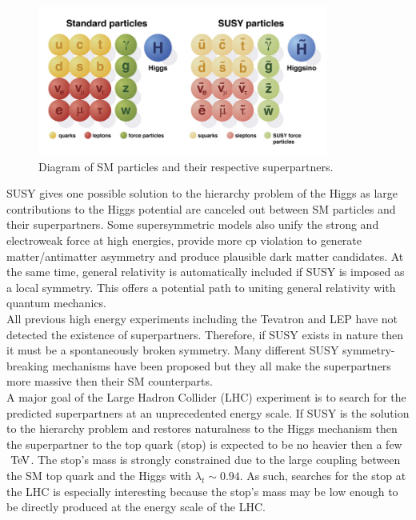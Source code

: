 \begin{figure}[h!]
\centering
    \includegraphics[width=0.85\textwidth]{figures/strategy/SUSYparticles.jpg}\hspace{0.05\textwidth}
\caption[Diagram of SM particles and their respective superpartners]{ Diagram of SM particles and their respective superpartners. }
\label{fig:SUSYpart}
\end{figure}

\indent SUSY gives one possible solution to the hierarchy problem of the Higgs as large contributions to the Higgs potential are canceled out between SM particles and their superpartners.  Some supersymmetric models also unify the strong and electroweak force at high energies, provide more cp violation to generate matter/antimatter asymmetry and produce plausible dark matter candidates.  At the same time, general relativity is automatically included if SUSY is imposed as a local symmetry. This offers a potential path to uniting general relativity with quantum mechanics.  \\

\indent All previous high energy experiments including the Tevatron and LEP have not detected the existence of superpartners.  Therefore, if SUSY exists in nature then it must be a spontaneously broken symmetry.  Many different SUSY symmetry-breaking mechanisms have been proposed but they all make the superpartners more massive then their SM counterparts. \\

\indent A major goal of the Large Hadron Collider (LHC) experiment is to search for the predicted superpartners at an unprecedented energy scale.  If SUSY is the solution to the hierarchy problem and restores naturalness to the Higgs mechanism then the superpartner to the top quark (stop) is expected to be no heavier then a few $\tev$.  The stop's mass is strongly constrained due to the large coupling between the SM top quark and the Higgs with $\lambda_t \sim 0.94$.  As such, searches for the stop at the LHC is especially interesting because the stop's mass may be low enough to be directly produced at the energy scale of the LHC. \\

